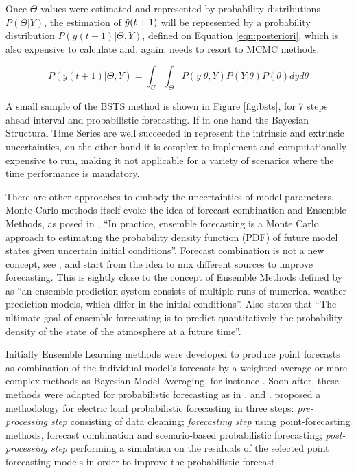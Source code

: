 Once $\Theta$ values were estimated and represented by probability distributions $P(\Theta|Y)$, the estimation of $\hat{y}(t+1)$ will be represented by a probability distribution $P(y(t+1)|\Theta,Y)$, defined on Equation \ref{eqn:posteriori}, which is also expensive to calculate and, again, needs to resort to MCMC methods. 

\begin{equation}
    P(y(t+1)|\Theta,Y) =  \int_U \int_\Theta P(y|\theta,Y)P(Y|\theta)P(\theta) dy d\theta
    \label{eqn:posteriori}
\end{equation}

A small sample of the BSTS method is shown in Figure \ref{fig:bsts}, for 7 steps ahead interval and probabilistic forecasting. If in one hand the Bayesian Structural Time Series are well succeeded in represent the intrinsic and extrinsic uncertainties, on the other hand it is complex to implement and computationally expensive to run, making it not applicable for a variety of scenarios where the time performance is mandatory.


There are other approaches to embody the  uncertainties of model parameters. Monte Carlo methods itself evoke the idea of forecast combination and Ensemble Methods, as posed in \cite{Smith2001}, ``In practice, ensemble forecasting is a Monte Carlo approach to estimating the probability density function (PDF) of future model states given uncertain initial conditions''. Forecast combination is not a new concept, see \citep{Clemen1989}, and start from the idea to mix different sources to improve forecasting. This is sightly close to the concept of Ensemble Methods defined by \cite{Gneiting2008} as ``an ensemble prediction system consists of multiple runs of numerical weather prediction models, which differ in the initial conditions''. Also \cite{Leutbecher2008} states that ``The ultimate goal of ensemble forecasting is to predict quantitatively the probability density of the state of the atmosphere at a future time''. 

Initially Ensemble Learning methods were developed to produce point forecasts as combination of the individual model's forecasts by a weighted average or more complex methods as Bayesian Model Averaging, for instance  \cite{Raftery2005}. Soon after, these methods were adapted for probabilistic forecasting as in \cite{Gneiting2005}, \cite{Leutbecher2008} and \cite{Fraley2013}. \cite{Xie2016} proposed a methodology for electric load probabilistic forecasting in three steps: \textit{pre-processing step} consisting of data cleaning;  \textit{forecasting step} using point-forecasting methods, forecast combination and scenario-based probabilistic forecasting; \textit{post-processing step} performing a simulation on the residuals of the selected point forecasting models in order to improve the probabilistic forecast.

